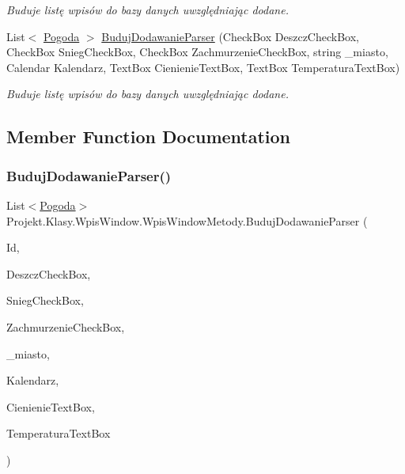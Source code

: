 \begin{DoxyCompactItemize}
\begin{DoxyCompactList}\small\item\em Buduje listę wpisów do bazy danych uwzględniając dodane. \end{DoxyCompactList}\item 
List$<$ \mbox{\hyperlink{class_projekt_1_1_baza_1_1_pogoda}{Pogoda}} $>$ \mbox{\hyperlink{class_projekt_1_1_klasy_1_1_wpis_window_1_1_wpis_window_metody_a8860fc9dd75fb6aae85ee31f61eedf81}{Buduj\+Dodawanie\+Parser}} (Check\+Box Deszcz\+Check\+Box, Check\+Box Snieg\+Check\+Box, Check\+Box Zachmurzenie\+Check\+Box, string \+\_\+miasto, Calendar Kalendarz, Text\+Box Cienienie\+Text\+Box, Text\+Box Temperatura\+Text\+Box)
\begin{DoxyCompactList}\small\item\em Buduje listę wpisów do bazy danych uwzględniając dodane. \end{DoxyCompactList}\end{DoxyCompactItemize}


\subsection{Member Function Documentation}
\mbox{\label{class_projekt_1_1_klasy_1_1_wpis_window_1_1_wpis_window_metody_a79fc019266feb11020642110c63c4402}} 
\subsubsection{\texorpdfstring{BudujDodawanieParser()}{BudujDodawanieParser()}\hspace{0.1cm}{\footnotesize\ttfamily [1/2]}}
{\footnotesize\ttfamily List$<$\mbox{\hyperlink{class_projekt_1_1_baza_1_1_pogoda}{Pogoda}}$>$ Projekt.\+Klasy.\+Wpis\+Window.\+Wpis\+Window\+Metody.\+Buduj\+Dodawanie\+Parser (\begin{DoxyParamCaption}\item[{int}]{Id,  }\item[{Check\+Box}]{Deszcz\+Check\+Box,  }\item[{Check\+Box}]{Snieg\+Check\+Box,  }\item[{Check\+Box}]{Zachmurzenie\+Check\+Box,  }\item[{string}]{\+\_\+miasto,  }\item[{Calendar}]{Kalendarz,  }\item[{Text\+Box}]{Cienienie\+Text\+Box,  }\item[{Text\+Box}]{Temperatura\+Text\+Box }\end{DoxyParamCaption})}



